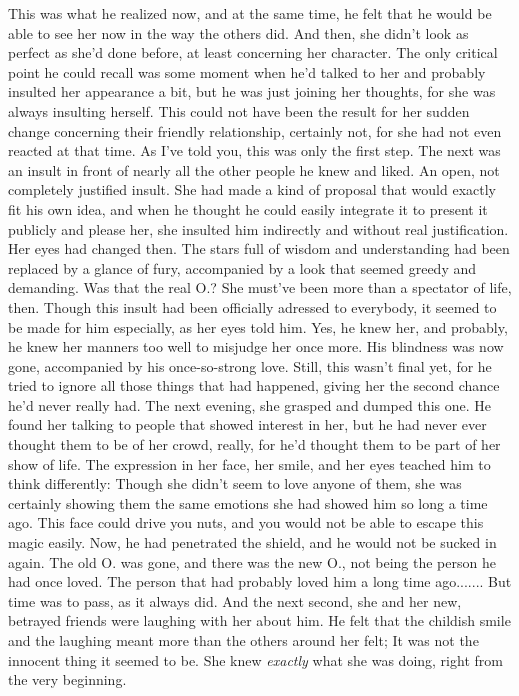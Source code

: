 This was what he realized now, and at the same time, he felt that he would be able to see her now in the way the others did. And then, she didn't look as perfect as she'd done before, at least concerning her character. 
The only critical point he could recall was some moment when he'd talked to her and probably insulted her appearance a bit, but he was just joining her thoughts, for she was always insulting herself. This could not have been the result for her sudden change concerning their friendly relationship, certainly not, for she had not even reacted at that time. 
As I've told you, this was only the first step. The next was an insult in front of nearly all the other people he knew and liked. 
An open, not completely justified insult. 
She had made a kind of proposal that would exactly fit his own idea, and when he thought he could easily integrate it to present it publicly and please her, she insulted him indirectly and without real justification. 
Her eyes had changed then. The stars full of wisdom and understanding had been replaced by a glance of fury, accompanied by a look that seemed greedy and demanding. Was that the real O.? 
She must've been more than a spectator of life, then. Though this insult had been officially adressed to everybody, it seemed to be made for him especially, as her eyes told him. Yes, he knew her, and probably, he knew her manners too well to misjudge her once more. 
His blindness was now gone, accompanied by his once-so-strong love. Still, this wasn't final yet, for he tried to ignore all those things that had happened, giving her the second chance he'd never really had. 
The next evening, she grasped and dumped this one. 
He found her talking to people that showed interest in her, but he had never ever thought them to be of her crowd, really, for he'd thought them to be part of her show of life. The expression in her face, her smile, and her eyes teached him to think differently: Though she didn't seem to love anyone of them, she was certainly showing them the same emotions she had showed him so long a time ago. This face could drive you nuts, and you would not be able to escape this magic easily. Now, he had penetrated the shield, and he would not be sucked in again. 
The old O. was gone, and there was the new O., not being the person he had once loved. The person that had probably loved him a long time ago....... 
But time was to pass, as it always did. And the next second, she and her new, betrayed friends were laughing with her about him. 
He felt that the childish smile and the laughing meant more than the others around her felt; It was not the innocent thing it seemed to be. She knew \emph{exactly} what she was doing, right from the very beginning. 
